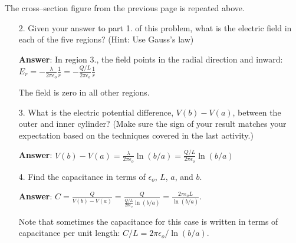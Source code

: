\documentclass{article}
\newcommand{\ds}[0]{\displaystyle}
\begin{document}
\ifsolutions

\else



The cross--section figure from the previous page is repeated above.
\fi

\begin{enumerate}

  \item[2.] Given your answer to part 1. of this problem, what is the electric field in each of the five regions? (Hint: Use Gauss's law)

            \ifsolutions
            \textbf{Answer}: In region 3., the field points in the radial direction and inward: $\ds E_r = -\frac{\lambda }{2\pi\epsilon_o}\frac{1}{r} = -\frac{Q/L}{2\pi\epsilon_o}\frac{1}{r}$

            The field is zero in all other regions.
            \else
            \vskip 96pt
            \fi

  \item[3.] What is the electric potential difference, $V(b)-V(a)$, between the outer and inner cylinder? (Make sure the sign of your result matches your expectation based on the techniques covered in the last activity.)

            \ifsolutions
            \textbf{Answer}: $\ds V(b)-V(a) =  \frac{\lambda}{2\pi\epsilon_o}\ln(b/a) = \frac{Q/L}{2\pi\epsilon_o}\ln(b/a) $
            \else
            \vskip 96pt
            \fi

  \item[4.] Find the capacitance in terms of $\epsilon_o$, $L$, $a$, and $b$.

            \ifsolutions
            \textbf{Answer}: $\displaystyle C= \frac{Q}{V(b)-V(a)} = \frac{Q}{\frac{Q/L}{2\pi\epsilon_o}\ln(b/a)}=\frac{2\pi \epsilon_o L}{\ln(b/a)}$.

            Note that sometimes the capacitance for this case is written in terms of capacitance per unit length: $\ds C/L={2\pi \epsilon_o}/{\ln(b/a)}$.
            \else
            \vskip 120pt
            \fi

\end{enumerate}
\end{document}
